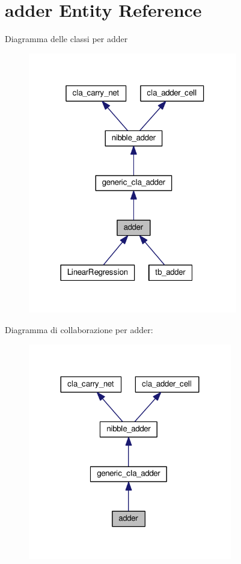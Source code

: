 \hypertarget{classadder}{}\section{adder Entity Reference}
\label{classadder}


Diagramma delle classi per adder
\nopagebreak
\begin{figure}[H]
\begin{center}
\leavevmode
\includegraphics[width=259pt]{classadder__inherit__graph}
\end{center}
\end{figure}


Diagramma di collaborazione per adder\+:
\nopagebreak
\begin{figure}[H]
\begin{center}
\leavevmode
\includegraphics[width=252pt]{classadder__coll__graph}
\end{center}
\end{figure}
